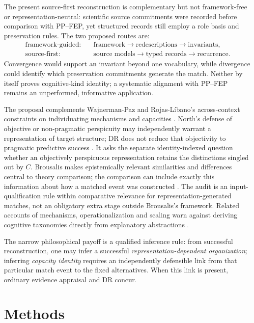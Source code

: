 \documentclass[11pt]{article}
\begin{document}
The present source-first reconstruction is complementary but not framework-free or representation-neutral: scientific source commitments were recorded before comparison with PP--FEP, yet structured records still employ a role basis and preservation rules. The two proposed routes are:
\[
\begin{aligned}
\text{framework-guided:}\quad
&\text{framework}\to\text{redescriptions}\to\text{invariants},\\
\text{source-first:}\quad
&\text{source models}\to\text{typed records}\to\text{recurrence}.
\end{aligned}
\]
Convergence would support an invariant beyond one vocabulary, while divergence could identify which preservation commitments generate the match. Neither by itself proves cognitive-kind identity; a systematic alignment with PP--FEP remains an unperformed, informative application.

The proposal complements Wajnerman-Paz and Rojas-L\'ibano's across-context constraints on individuating mechanisms and capacities \citep{WajnermanPazRojasLibano2026Bidimensional}. North's defense of objective or non-pragmatic perspicuity may independently warrant a representation of target structure; DR does not reduce that objectivity to pragmatic predictive success \citep{North2026Perspicuous}. It asks the separate identity-indexed question whether an objectively perspicuous representation retains the distinctions singled out by \(C\). Brousalis makes epistemically relevant similarities and differences central to theory comparison; the comparison can include exactly this information about how a matched event was constructed \citep{Brousalis2026TheoryComparison}. The audit is an input-qualification rule within comparative relevance for representation-generated matches, not an obligatory extra stage outside Brousalis's framework. Related accounts of mechanisms, operationalization and scaling warn against deriving cognitive taxonomies directly from explanatory abstractions \citep{FranckenSlorsCraver2022CognitiveOntology,Krickel2024CognitiveOntology,Kohar2025ScalingUp}.

The narrow philosophical payoff is a qualified inference rule: from successful reconstruction, one may infer a successful \emph{representation-dependent organization}; inferring \emph{capacity identity} requires an independently defensible link from that particular match event to the fixed alternatives. When this link is present, ordinary evidence appraisal and DR concur.

\section{Methods}
\end{document}
